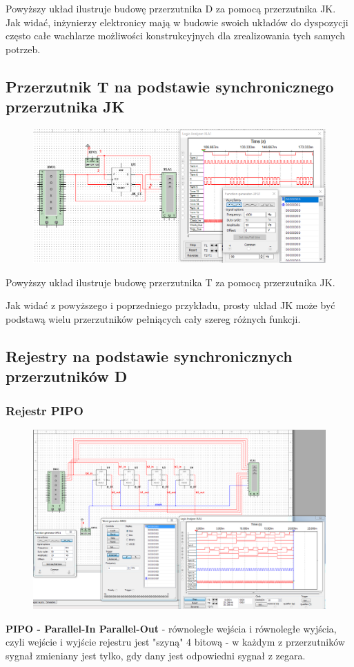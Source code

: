 \documentclass[12pt,a4paper]{article}
\begin{document}
Powyższy układ ilustruje budowę przerzutnika D za pomocą przerzutnika JK. Jak widać, inżynierzy elektronicy mają w budowie swoich układów do dyspozycji często całe wachlarze możliwości konstrukcyjnych dla zrealizowania tych samych potrzeb.


\subsection{Przerzutnik T na podstawie synchronicznego przerzutnika JK}
\begin{figure}[H]
\centering
\includegraphics[width=\textwidth]{img/3g}
\end{figure}

Powyższy układ ilustruje budowę przerzutnika T za pomocą przerzutnika JK. 

Jak widać z powyższego i poprzedniego przykładu, prosty układ JK może być podstawą wielu przerzutników pełniących cały szereg różnych funkcji. 
\subsection{Rejestry na podstawie synchronicznych przerzutników D}

\subsubsection{Rejestr PIPO}
\begin{figure}[H]
\centering
\includegraphics[width=\textwidth]{img/3hPIPO}
\end{figure}
\textbf{PIPO - Parallel-In Parallel-Out} - równoległe wejścia i równoległe wyjścia, czyli wejście i wyjście rejestru jest "szyną" 4 bitową - w każdym z przerzutników sygnał zmieniany jest tylko, gdy dany jest odpowiedni sygnał z zegara.
\end{document}
